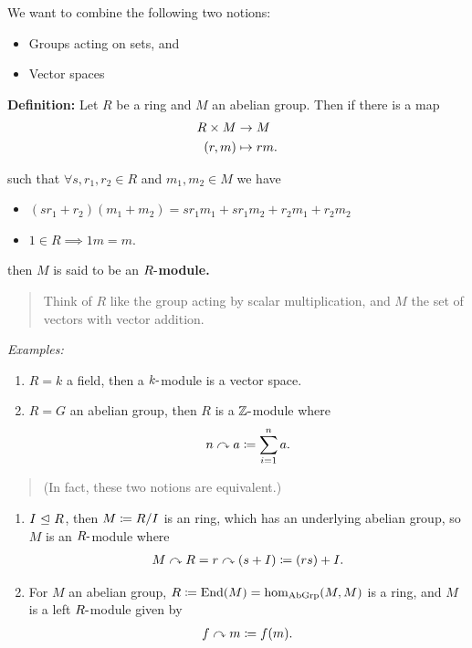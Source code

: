 We want to combine the following two notions:

\begin{itemize}
\item
  Groups acting on sets, and
\item
  Vector spaces
\end{itemize}

\textbf{Definition:} Let \(R\) be a ring and \(M\) an abelian group.
Then if there is a map \begin{align*}
R\times M &\to M \\
(r,m) &\mapsto rm
.\end{align*}

such that \(\forall s,r_1,r_2 \in R\) and \(m_1,m_2 \in M\) we have

\begin{itemize}
\tightlist
\item
  \((sr_1 + r_2)(m_1 + m_2) = sr_1m_1 + sr_1m_2 + r_2m_1 + r_2 m_2\)
\item
  \(1\in R \implies 1m = m\).
\end{itemize}

then \(M\) is said to be an \textbf{\(R{\hbox{-}}\)module.}

\begin{quote}
Think of \(R\) like the group acting by scalar multiplication, and \(M\)
the set of vectors with vector addition.
\end{quote}

\emph{Examples:}

\begin{enumerate}
\def\labelenumi{\arabic{enumi}.}
\item
  \(R = k\) a field, then a \(k{\hbox{-}}\)module is a vector space.
\item
  \(R = G\) an abelian group, then \(R\) is a \({\mathbb{Z}}{\hbox{-}}\)module where
  \begin{align*}
  n\curvearrowright a \coloneqq \sum_{i=1}^n a
  .\end{align*}
\end{enumerate}

\begin{quote}
(In fact, these two notions are equivalent.)
\end{quote}

\begin{enumerate}
\def\labelenumi{\arabic{enumi}.}
\setcounter{enumi}{2}
\item
  \(I {~\trianglelefteq~} R\), then \(M \coloneqq R/I\) is an ring, which has an
  underlying abelian group, so \(M\) is an \(R{\hbox{-}}\)module where
  \begin{align*}
  M\curvearrowright R = r\curvearrowright(s+I) \coloneqq (rs) + I
  .\end{align*}
\item
  For \(M\) an abelian group,
  \(R \coloneqq \mathrm{End}(M) = \hom_{\text{AbGrp}}(M, M)\) is a
  ring, and \(M\) is a left \(R{\hbox{-}}\)module given by
  \begin{align*}
  f\curvearrowright m \coloneqq f(m)
  .\end{align*}
\end{enumerate}


